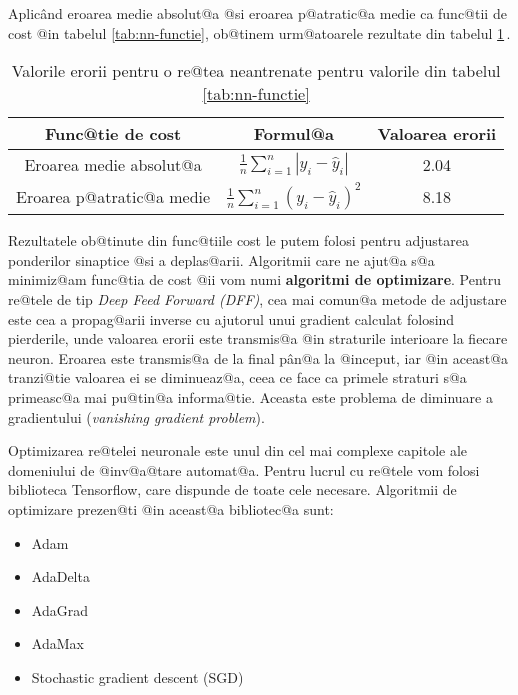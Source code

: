 Aplic\^ and eroarea medie absolut@a @si eroarea p@atratic@a medie ca func@tii de cost @in tabelul \ref{tab:nn-functie}, ob@tinem urm@atoarele rezultate din tabelul \ref{tab:nn-erori}\,.

\begin{table}[h]
	\begin{center}
		\begin{tabular}{|c|c|c|}
			\hline
			Func@tie de cost & Formul@a & Valoarea erorii \\
			\hline
			Eroarea medie absolut@a & $\displaystyle\frac{1}{n} \sum_{i=1}^{n} |y_i - \hat{y}_i| $ & 2.04 \\
			\hline
			Eroarea p@atratic@a medie & $\displaystyle\frac{1}{n} \sum_{i=1}^{n} \left( y_i - \hat{y}_i \right)^2 $ & 8.18 \\
			\hline
		\end{tabular}
	\end{center}
	\caption{Valorile erorii pentru o re@tea neantrenate pentru valorile din tabelul \ref{tab:nn-functie}}
	\label{tab:nn-erori}
\end{table}

Rezultatele ob@tinute din func@tiile cost le putem folosi pentru adjustarea pon\-de\-ri\-lor sinaptice @si a deplas@arii. Algoritmii care ne ajut@a s@a minimiz@am func@tia de cost @ii vom numi \textbf{algoritmi de optimizare}. Pentru re@tele de tip \textsl{Deep Feed Forward (DFF)}, cea mai comun@a metode de adjustare este cea a propag@arii inverse cu ajutorul unui gradient calculat folosind pierderile, unde valoarea erorii este transmis@a @in straturile interioare la fiecare neuron. Eroarea este transmis@a de la final p\^ an@a la @inceput, iar @in aceast@a tranzi@tie valoarea ei se diminueaz@a, ceea ce face ca primele straturi s@a primeasc@a mai pu@tin@a informa@tie. Aceasta este problema de diminuare a gradientului (\textsl{vanishing gradient problem}).

Optimizarea re@telei neuronale este unul din cel mai complexe capitole ale do\-me\-niu\-lui de @inv@a@tare automat@a. Pentru lucrul cu re@tele vom folosi biblioteca Tensorflow, care dispunde de toate cele necesare. Algoritmii de optimizare prezen@ti @in aceast@a bibliotec@a sunt:

\begin{itemize}
	\item Adam
	\item AdaDelta
	\item AdaGrad
	\item AdaMax
	\item Stochastic gradient descent (SGD)
\end{itemize} 

